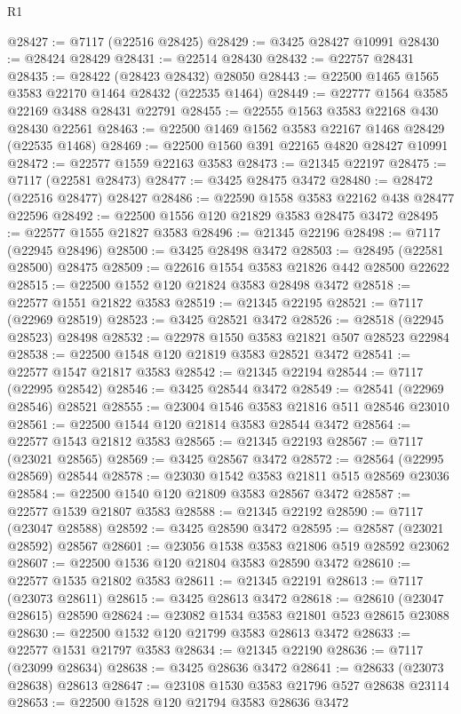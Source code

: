 \begin{lexlean}{R1}
\begin{coremodule}
@28427 := @7117 (@22516 @28425)
@28429 := @3425 @28427 @10991
@28430 := @28424 @28429
@28431 := @22514 @28430
@28432 := @22757 @28431
@28435 := @28422 (@28423 @28432) @28050
@28443 := @22500 @1465 @1565 @3583 @22170 @1464 @28432 (@22535 @1464)
@28449 := @22777 @1564 @3585 @22169 @3488 @28431 @22791
@28455 := @22555 @1563 @3583 @22168 @430 @28430 @22561
@28463 := @22500 @1469 @1562 @3583 @22167 @1468 @28429 (@22535 @1468)
@28469 := @22500 @1560 @391 @22165 @4820 @28427 @10991
@28472 := @22577 @1559 @22163 @3583
@28473 := @21345 @22197
@28475 := @7117 (@22581 @28473)
@28477 := @3425 @28475 @3472
@28480 := @28472 (@22516 @28477) @28427
@28486 := @22590 @1558 @3583 @22162 @438 @28477 @22596
@28492 := @22500 @1556 @120 @21829 @3583 @28475 @3472
@28495 := @22577 @1555 @21827 @3583
@28496 := @21345 @22196
@28498 := @7117 (@22945 @28496)
@28500 := @3425 @28498 @3472
@28503 := @28495 (@22581 @28500) @28475
@28509 := @22616 @1554 @3583 @21826 @442 @28500 @22622
@28515 := @22500 @1552 @120 @21824 @3583 @28498 @3472
@28518 := @22577 @1551 @21822 @3583
@28519 := @21345 @22195
@28521 := @7117 (@22969 @28519)
@28523 := @3425 @28521 @3472
@28526 := @28518 (@22945 @28523) @28498
@28532 := @22978 @1550 @3583 @21821 @507 @28523 @22984
@28538 := @22500 @1548 @120 @21819 @3583 @28521 @3472
@28541 := @22577 @1547 @21817 @3583
@28542 := @21345 @22194
@28544 := @7117 (@22995 @28542)
@28546 := @3425 @28544 @3472
@28549 := @28541 (@22969 @28546) @28521
@28555 := @23004 @1546 @3583 @21816 @511 @28546 @23010
@28561 := @22500 @1544 @120 @21814 @3583 @28544 @3472
@28564 := @22577 @1543 @21812 @3583
@28565 := @21345 @22193
@28567 := @7117 (@23021 @28565)
@28569 := @3425 @28567 @3472
@28572 := @28564 (@22995 @28569) @28544
@28578 := @23030 @1542 @3583 @21811 @515 @28569 @23036
@28584 := @22500 @1540 @120 @21809 @3583 @28567 @3472
@28587 := @22577 @1539 @21807 @3583
@28588 := @21345 @22192
@28590 := @7117 (@23047 @28588)
@28592 := @3425 @28590 @3472
@28595 := @28587 (@23021 @28592) @28567
@28601 := @23056 @1538 @3583 @21806 @519 @28592 @23062
@28607 := @22500 @1536 @120 @21804 @3583 @28590 @3472
@28610 := @22577 @1535 @21802 @3583
@28611 := @21345 @22191
@28613 := @7117 (@23073 @28611)
@28615 := @3425 @28613 @3472
@28618 := @28610 (@23047 @28615) @28590
@28624 := @23082 @1534 @3583 @21801 @523 @28615 @23088
@28630 := @22500 @1532 @120 @21799 @3583 @28613 @3472
@28633 := @22577 @1531 @21797 @3583
@28634 := @21345 @22190
@28636 := @7117 (@23099 @28634)
@28638 := @3425 @28636 @3472
@28641 := @28633 (@23073 @28638) @28613
@28647 := @23108 @1530 @3583 @21796 @527 @28638 @23114
@28653 := @22500 @1528 @120 @21794 @3583 @28636 @3472

\end{coremodule}
\end{lexlean}
